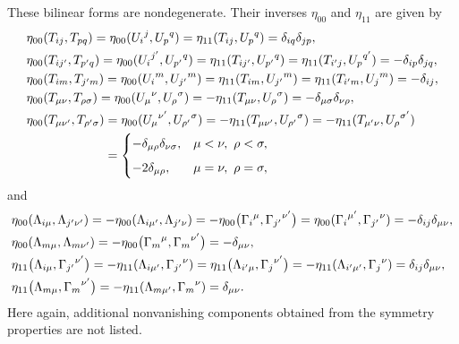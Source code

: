 \documentclass[pdftex]{sigma}
\numberwithin{equation}{section}
\theoremstyle{definition}
\begin{document}
These bilinear forms are nondegenerate. Their inverses $\eta_{00}$ and $\eta_{11}$ are given by
\begin{align*}
	&\eta_{00}(T_{ij},T_{pq})= \eta_{00}({U_i}^j, {U_p}^q) = \eta_{11}(T_{ij},{U_p}^q) = \delta_{iq} \delta_{jp},
	\notag\\
	&\eta_{00}(T_{ij'}, T_{p'q})= \eta_{00}({U_i}^{j'}, {U_{p'}}^{q}) = \eta_{11}(T_{ij'},{U_{p'}}^q) = \eta_{11}(T_{i'j},{U_p}^{q'}) = -\delta_{ip} \delta_{jq},
	\notag \\
&	\eta_{00}(T_{im}, T_{j'm})= \eta_{00}({U_i}^m,{U_{j'}}^m) = \eta_{11}(T_{im},{U_{j'}}^m) = \eta_{11}(T_{i'm}, {U_j}^m) = -\delta_{ij},
	\notag \\
&	\eta_{00}(T_{\mu\nu}, T_{\rho\sigma})= \eta_{00}({U_{\mu}}^{\nu},{U_{\rho}}^{\sigma}) = -\eta_{11}(T_{\mu\nu},{U_{\rho}}^{\sigma})= -\delta_{\mu\sigma} \delta_{\nu\rho},
	\notag\\
&	\eta_{00}(T_{\mu\nu'}, T_{\rho'\sigma})= \eta_{00}({U_{\mu}}^{\nu'},{U_{\rho'}}^{\sigma}) = -\eta_{11}(T_{\mu\nu'},{U_{\rho'}}^{\sigma}) =
	-\eta_{11}(T_{\mu'\nu},{U_{\rho}}^{\sigma'})
	\notag\\
	&\hphantom{\eta_{00}(T_{\mu\nu'}, T_{\rho'\sigma})} {} =
	\begin{cases}
		-\delta_{\mu\rho} \delta_{\nu\sigma}, & \mu < \nu, \ \rho < \sigma,
		\\[5pt]
		-2 \delta_{\mu\rho}, & \mu = \nu, \ \rho=\sigma,
	\end{cases}
\end{align*}
and
\begin{align*}
	&\eta_{00}(\Lambda_{i\mu}, \Lambda_{j'\nu'})= -\eta_{00}(\Lambda_{i\mu'}, \Lambda_{j'\nu}) = -\eta_{00}\bigl({\Gamma_i}^{\mu}, {\Gamma_{j'}}^{\nu'}\bigr) = \eta_{00}({\Gamma_i}^{\mu'}, {\Gamma_{j'}}^{\nu}) = -\delta_{ij}\delta_{\mu\nu},
	\notag\\
&	\eta_{00}(\Lambda_{m\mu}, \Lambda_{m\nu'})= -\eta_{00}\bigl({\Gamma_m}^{\mu}, {\Gamma_m}^{\nu'}\bigr) = -\delta_{\mu\nu},
	\notag\\
&	\eta_{11}\bigl(\Lambda_{i\mu},{\Gamma_{j'}}^{\nu'}\bigr)= -\eta_{11}(\Lambda_{i\mu'},{\Gamma_{j'}}^{\nu}) = \eta_{11}\bigl(\Lambda_{i'\mu},{\Gamma_{j}}^{\nu'}\bigr) = -\eta_{11}(\Lambda_{i'\mu'},{\Gamma_j}^{\nu}) = \delta_{ij} \delta_{\mu\nu},
	\notag\\
&	\eta_{11}\bigl(\Lambda_{m\mu},{\Gamma_m}^{\nu'}\bigr)=-\eta_{11}(\Lambda_{m\mu'},{\Gamma_m}^{\nu}) = \delta_{\mu\nu}.
\end{align*}
Here again, additional nonvanishing components obtained from the symmetry properties are not listed.
\end{document}
